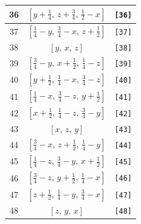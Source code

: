 \documentclass[fleqn,8pt]{jsarticle}
\begin{document}
\begin{longtable}{ccc}
36 & $\left[ y + \frac{1}{4},\, z + \frac{3}{4},\, \frac{1}{2} - x \right]$ & {\tt [36]} \\ \hline
37 & $\left[ \frac{1}{4} - y,\, \frac{3}{4} - x,\, z + \frac{1}{2} \right]$ & {\tt [37]} \\ \hline
38 & $\left[ y,\, x,\, z \right]$ & {\tt [38]} \\ \hline
39 & $\left[ \frac{3}{4} - y,\, x + \frac{1}{2},\, \frac{1}{4} - z \right]$ & {\tt [39]} \\ \hline
40 & $\left[ y + \frac{1}{2},\, \frac{1}{4} - x,\, \frac{3}{4} - z \right]$ & {\tt [40]} \\ \hline
41 & $\left[ \frac{1}{4} - x,\, \frac{3}{4} - z,\, y + \frac{1}{2} \right]$ & {\tt [41]} \\ \hline
42 & $\left[ x + \frac{1}{2},\, \frac{1}{4} - z,\, \frac{3}{4} - y \right]$ & {\tt [42]} \\ \hline
43 & $\left[ x,\, z,\, y \right]$ & {\tt [43]} \\ \hline
44 & $\left[ \frac{3}{4} - x,\, z + \frac{1}{2},\, \frac{1}{4} - y \right]$ & {\tt [44]} \\ \hline
45 & $\left[ \frac{1}{4} - z,\, \frac{3}{4} - y,\, x + \frac{1}{2} \right]$ & {\tt [45]} \\ \hline
46 & $\left[ \frac{3}{4} - z,\, y + \frac{1}{2},\, \frac{1}{4} - x \right]$ & {\tt [46]} \\ \hline
47 & $\left[ z + \frac{1}{2},\, \frac{1}{4} - y,\, \frac{3}{4} - x \right]$ & {\tt [47]} \\ \hline
48 & $\left[ z,\, y,\, x \right]$ & {\tt [48]} \\
\end{longtable}
\end{document}
